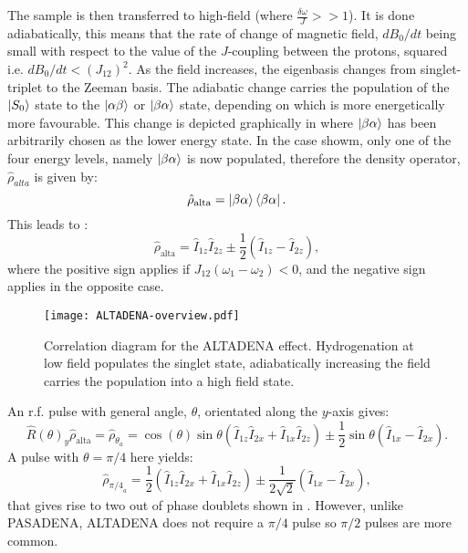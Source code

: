  The sample is then transferred to high-field (where $\frac{\delta{\omega}}{J}>>1$). It is done adiabatically, this means that the rate
 of change of magnetic field, $dB_0/dt$ being small with respect to the value of the $J$-coupling between the protons, squared i.e. $dB_0/dt < (J_{12})^2$. As
 the field increases, the eigenbasis changes from singlet-triplet to the Zeeman basis. The adiabatic change carries the population of the
 $\ket{S_0}$ state to the $\ket{\alpha\beta}$ or $\ket{\beta\alpha}$ state, depending on which is more energetically more favourable.
 This change is depicted graphically in  where $\ket{\beta\alpha}$ has been arbitrarily chosen as the lower energy state.
 In the case showm, only one of the four energy levels, namely $\ket{\beta\alpha}$ is now populated, therefore the density operator, $\hat{\rho}_{alta}$ is given by:
 \begin{equation}
   \hat{\rho}_{\text{alta}} = \ket{\beta\alpha}\bra{\beta\alpha}.
 \end{equation}
  This leads to \citep{RN128}:
 \begin{equation}
   \hat{\rho}_{\text{alta}} = \hat{I}_{1z}\hat{I}_{2z}±\frac{1}{2}(\hat{I}_{1z}-\hat{I}_{2z}),
 \end{equation}
 where the positive sign applies if $J_{12}(\omega_1 - \omega_2)<0$, and the negative
 sign applies in the opposite case.

 \begin{figure}
   \begin{center}
   \texttt{[image: ALTADENA-overview.pdf]}
   \end{center}
   \caption{Correlation diagram for the ALTADENA effect. Hydrogenation at low field populates the singlet state, adiabatically increasing
   the field carries the population into a high field state.}
   \label{fig:SingletTriplet}
 \end{figure}

 An r.f. pulse with general angle, $\theta$, orientated along the $y$-axis gives:
 \begin{equation}
   \hat{R}(\theta)_y\hat{\rho}_{\text{alta}} = \hat{\rho}_\theta_a = \cos(\theta)\sin{\theta}(\hat{I}_{1z}\hat{I}_{2x} + \hat{I}_{1x}\hat{I}_{2z})
   ± \frac{1}{2}\sin\theta(\hat{I}_{1x} - \hat{I}_{2x}).
 \end{equation}
 A pulse with $\theta = \pi/4$ here yields:
 \begin{equation}
   \hat{\rho}_{\pi/4}_a = \frac{1}{2}(\hat{I}_{1z}\hat{I}_{2x} + \hat{I}_{1x}\hat{I}_{2z}) ± \frac{1}{2\sqrt{2}}(\hat{I}_{1x} - \hat{I}_{2x}),
 \end{equation}
 that gives rise to two out of phase doublets shown in . However, unlike PASADENA, ALTADENA does not require
 a $\pi/4$ pulse so $\pi/2$ pulses are more common.


